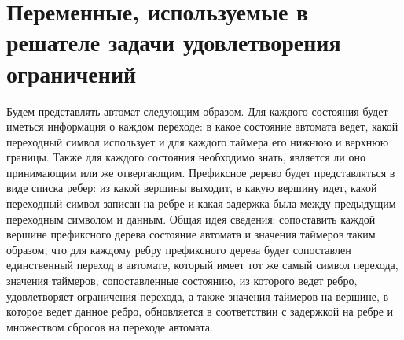 \documentclass[times,specification,annotation]{itmo-student-thesis}
\begin{document}
\section{Переменные, используемые в решателе задачи удовлетворения ограничений}

Будем представлять автомат следующим образом. Для каждого состояния будет иметься информация о каждом переходе: в какое состояние автомата ведет, какой переходный символ использует
и для каждого таймера его нижнюю и верхнюю границы. Также для каждого состояния необходимо знать, является ли оно принимающим или же отвергающим.
Префиксное дерево будет представляться в виде списка ребер: из какой вершины выходит, в какую вершину идет, какой переходный
символ записан на ребре и какая задержка была между предыдущим переходным символом и данным. Общая идея сведения: сопоставить каждой вершине префиксного дерева
состояние автомата и значения таймеров таким образом, что для каждому ребру префиксного дерева будет сопоставлен единственный переход в автомате, который
имеет тот же самый символ перехода, значения таймеров, сопоставленные состоянию, из которого ведет ребро, удовлетворяет ограничения перехода, а также
значения таймеров на вершине, в которое ведет данное ребро, обновляется в соответствии с задержкой на ребре и множеством сбросов на переходе автомата.
\end{document}

